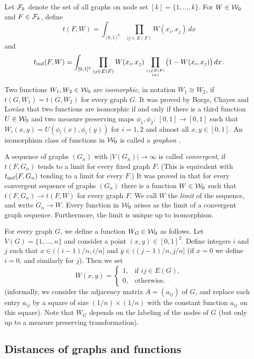 \documentclass{article}
\begin{document}
Let $\mathcal{F}_k$ denote the set of all graphs on node set
$[k]=\{1,\dots,k\}$. For $W\in\mathcal{W}_0$ and $F\in\mathcal{F}_k$, define
\[
t(F,W)=\int_{[0,1]^k} \prod_{ij\in E(F)} W(x_i,x_j)\,dx
\]
and
\[
t_{\rm ind}(F,W)=\int_{[0,1]^k} \prod_{ij\in E(F)}
W(x_i,x_j)\prod_{ij\notin E(F)\atop i\not= j}
\bigl(1-W(x_i,x_j)\bigr)\,dx\,.
\]

Two functions $W_1,W_2\in\mathcal{W}_0$ are {\it isomorphic}, in notation
$W_1\cong W_2$, if $t(G,W_1)=t(G,W_2)$ for every graph $G$. It was
proved by Borgs, Chayes and Lov\'asz \cite{BCL} that two functions
are isomorphic if and only if there is a third function $U\in\mathcal{W}_0$
and two measure preserving maps $\phi_1,\phi_2:~[0,1]\to[0,1]$ such
that $W_i(x,y)=U(\phi_i(x),\phi_i(y))$ for $i=1,2$ and almost all
$x,y\in[0,1]$. An isomorphism class of functions in $\mathcal{W}_0$ is called
a {\it graphon} \cite{BCLSV1}.

A sequence of graphs $(G_n)$ with $|V(G_n)|\to\infty$ is called {\it
convergent}, if $t(F,G_n)$ tends to a limit for every fixed graph
$F$. (This is equivalent with $t_{\rm ind}(F,G_n)$ tending to a limit for
every $F$.) It was proved in \cite{LSz} that for every convergent
sequence of graphs $(G_n)$ there is a function $W\in \mathcal{W}_0$ such that
$t(F,G_n)\to t(F,W)$ for every graph $F$. We call $W$ the {\it limit}
of the sequence, and write $G_n\to W$. Every function in $\mathcal{W}_0$
arises as the limit of a convergent graph sequence. Furthermore, the
limit is unique up to isomorphism.

For every graph $G$, we define a function $W_G\in\mathcal{W}_0$ as follows.
Let $V(G)=\{1,\dots,n\}$ and consider a point $(x,y)\in[0,1]^2$.
Define integers $i$ and $j$ such that $x\in ((i-1)/n,i/n]$ and $y\in
((j-1)/n,j/n]$ (if $x=0$ we define $i=0$, and similarly for $j$).
Then we set
\[
W(x,y)=
  \begin{cases}
    1, & \text{if $ij\in E(G)$}, \\
    0, & \text{otherwise}.
  \end{cases}
\]
(informally, we consider the adjacency matrix $A=(a_{ij})$ of $G$,
and replace each entry $a_{ij}$ by a square of size
$(1/n)\times(1/n)$ with the constant function $a_{ij}$ on this
square). Note that $W_G$ depends on the labeling of the nodes of $G$
(but only up to a measure preserving transformation).

\subsection{Distances of graphs and functions}
\end{document}
